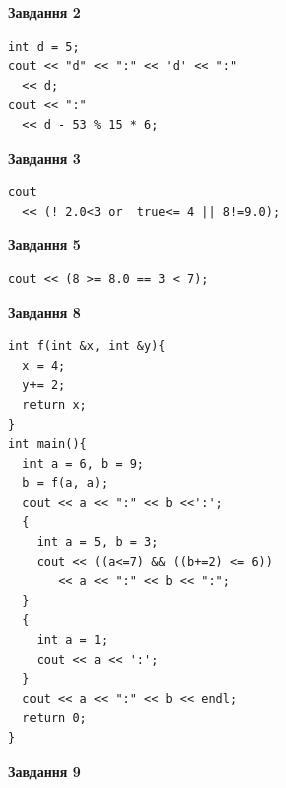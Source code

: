 \documentclass[12pt, ukrainian]{article}
\begin{document}
{\begin {large}
\begin{minipage}[t]{7.0cm}
\end{minipage}
\vline \hspace{1mm}
\begin{minipage}[t]{11.0cm}

\begin{center}
\textbf{Завдання 2}
\end{center}
\vspace{-8mm}

\begin{verbatim}
int d = 5;
cout << "d" << ":" << 'd' << ":" 
  << d;
cout << ":" 
  << d - 53 % 15 * 6;
\end{verbatim}



\begin{center}
\textbf{Завдання 3}
\end{center}
\vspace{-8mm}

\begin{verbatim}
cout 
  << (! 2.0<3 or  true<= 4 || 8!=9.0);
\end{verbatim}



\begin{center}
\textbf{Завдання 5}
\end{center}
\vspace{-8mm}

\begin{verbatim}
cout << (8 >= 8.0 == 3 < 7);
\end{verbatim}



\begin{center}
\textbf{Завдання 8}
\end{center}
\vspace{-8mm}

\begin{verbatim}
int f(int &x, int &y){
  x = 4;
  y+= 2;
  return x;
}
int main(){
  int a = 6, b = 9;
  b = f(a, a);
  cout << a << ":" << b <<':';
  {
    int a = 5, b = 3;
    cout << ((a<=7) && ((b+=2) <= 6))
       << a << ":" << b << ":";
  }
  {
    int a = 1;
    cout << a << ':';
  }
  cout << a << ":" << b << endl;
  return 0;
}
\end{verbatim}

\end{minipage}


\begin{minipage}[t]{7.0cm}

\begin{center}
\textbf{Завдання 9}
\end{center}
\vspace{-8mm}


\end{minipage}
\end{large}}
\end{document}
